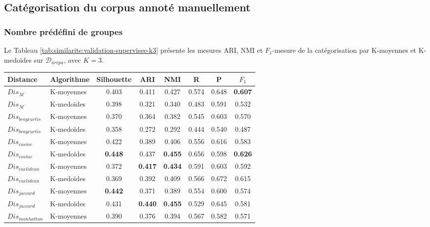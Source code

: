 \subsection{Catégorisation du corpus annoté manuellement}
\subsubsection{Nombre prédéfini de groupes}
 Le Tableau \ref{tab:similarite:validation-supervisee-k3} présente les mesures ARI, NMI et $F_1$-mesure de la catégorisation par K-moyennes et K-medoïdes sur $\mathcal{D}_{arcpa}$, avec $K=3$. 

\begin{table}[!htb]
	\centering \scriptsize
	\begin{tabular}[pos]{|l|l|c|c|c|c|c|c|}
		\hline
		\textbf{Distance}& \textbf{Algorithme}& \textbf{Silhouette}& \textbf{ARI} & \textbf{NMI} & \textbf{R} & \textbf{P} & \textbf{$F_1$} \\ \hline
		 $Dis_\mathcal{M}$          & K-moyennes    & 0.403      & 0.411 & 0.427 & 0.574  & 0.648     & \textbf{0.607} \\ \hline
		 $Dis_\mathcal{M}$          & K-medoïdes  & 0.398      & 0.321 & 0.340 & 0.483  & 0.591     & 0.532 \\ \hline
		 $Dis_{braycurtis}$ & K-moyennes    & 0.370      & 0.364 & 0.382 & 0.545  & 0.603     & 0.570 \\ \hline
		 $Dis_{braycurtis}$ & K-medoïdes  & 0.358      & 0.272 & 0.292 & 0.444  & 0.540     & 0.487 \\ \hline
		 $Dis_{cosine}$     & K-moyennes    & 0.422     & 0.389 & 0.406 & 0.556  & 0.616     & 0.583 \\ \hline
		 $Dis_{cosine}$     & K-medoïdes  & \textbf{0.448}      & 0.437 & \textbf{0.455} & 0.656  & 0.598     & \textbf{0.626} \\ \hline
		 $Dis_{euclidean}$  & K-moyennes    & 0.372      & \textbf{0.417} & \textbf{0.434} & 0.591  & 0.603     & 0.592 \\ \hline
		 $Dis_{euclidean}$  & K-medoïdes  & 0.369      & 0.392 & 0.409 & 0.566  & 0.672     & 0.615 \\ \hline
		 $Dis_{jaccard}$    & K-moyennes    & \textbf{0.442}      & 0.371 & 0.389 & 0.554  & 0.600     & 0.574 \\ \hline
		 $Dis_{jaccard}$    & K-medoïdes  & 0.431      & \textbf{0.440} & \textbf{0.455} & 0.529  & 0.645     & 0.581 \\ \hline
		 $Dis_{manhattan}$  & K-moyennes    & 0.390      & 0.376 & 0.394 & 0.567  & 0.582     & 0.571 \\ \hline

\end{tabular}
\end{table}

